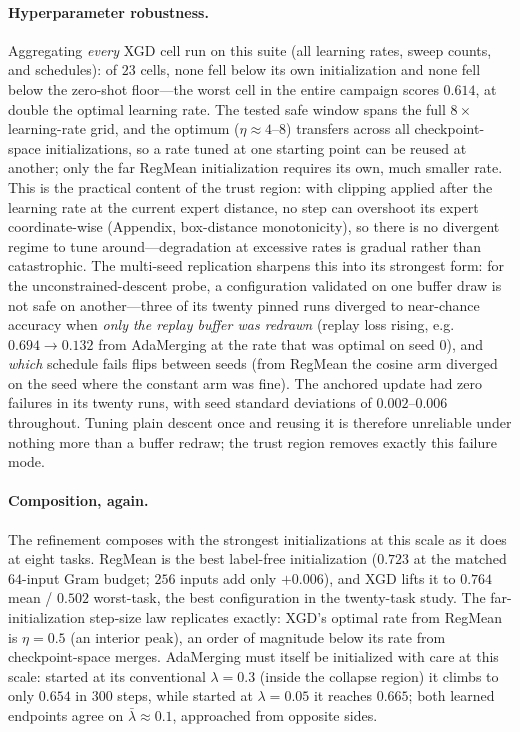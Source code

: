 \documentclass{article} %
\begin{document}
\paragraph{Hyperparameter robustness.}
Aggregating \emph{every} XGD cell run on this suite (all learning rates, sweep counts, and schedules): of $23$ cells, none fell below its own initialization and none fell below the zero-shot floor---the worst cell in the entire campaign scores $0.614$, at double the optimal learning rate. The tested safe window spans the full $8\times$ learning-rate grid, and the optimum ($\eta\approx4$--$8$) transfers across all checkpoint-space initializations, so a rate tuned at one starting point can be reused at another; only the far RegMean initialization requires its own, much smaller rate. This is the practical content of the trust region: with clipping applied after the learning rate at the current expert distance, no step can overshoot its expert coordinate-wise (Appendix, box-distance monotonicity), so there is no divergent regime to tune around---degradation at excessive rates is gradual rather than catastrophic. The multi-seed replication sharpens this into its strongest form: for the unconstrained-descent probe, a configuration validated on one buffer draw is not safe on another---three of its twenty pinned runs diverged to near-chance accuracy when \emph{only the replay buffer was redrawn} (replay loss rising, e.g.\ $0.694\!\to\!0.132$ from AdaMerging at the rate that was optimal on seed $0$), and \emph{which} schedule fails flips between seeds (from RegMean the cosine arm diverged on the seed where the constant arm was fine). The anchored update had zero failures in its twenty runs, with seed standard deviations of $0.002$--$0.006$ throughout. Tuning plain descent once and reusing it is therefore unreliable under nothing more than a buffer redraw; the trust region removes exactly this failure mode.

\paragraph{Composition, again.}
The refinement composes with the strongest initializations at this scale as it does at eight tasks. RegMean is the best label-free initialization ($0.723$ at the matched $64$-input Gram budget; $256$ inputs add only $+0.006$), and XGD lifts it to $0.764$ mean / $0.502$ worst-task, the best configuration in the twenty-task study. The far-initialization step-size law replicates exactly: XGD's optimal rate from RegMean is $\eta=0.5$ (an interior peak), an order of magnitude below its rate from checkpoint-space merges. AdaMerging must itself be initialized with care at this scale: started at its conventional $\lambda=0.3$ (inside the collapse region) it climbs to only $0.654$ in $300$ steps, while started at $\lambda=0.05$ it reaches $0.665$; both learned endpoints agree on $\bar\lambda\approx0.1$, approached from opposite sides.
\fi
\end{document}
